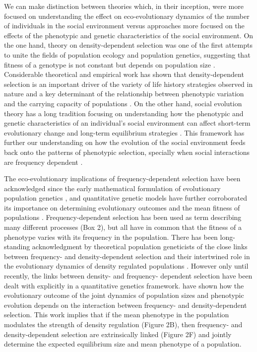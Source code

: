 \documentclass{article}
\begin{document}
We can make distinction between theories which, in their inception, were more focused on understanding the effect on eco-evolutionary dynamics of the number of individuals in the social environment versus approaches more focused on the effects of the phenotypic and genetic characteristics of the social environment. On the one hand, theory on density-dependent selection was one of the first attempts to unite the fields of population ecology and population genetics, suggesting that fitness of a genotype is not constant but depends on population size \citep{MacArthur1962, Anderson1971, Charlesworth1971}. Considerable theoretical and empirical work has shown that density-dependent selection is an important driver of the variety of life history strategies observed in nature and a key determinant of the relationship between phenotypic variation and the carrying capacity of populations \citep{Boyce1984, Mueller1991, Charlesworth1994,Travis2013, Joshi2001, Engen2013, Wright2018, Engen2020}. On the other hand, social evolution theory has a long tradition focusing on understanding how the phenotypic and genetic characteristics of an individual's social environment can affect short-term evolutionary change \citep{Hamilton1964a, frank1998foundations, Wolf1999SocialSelection, Queller1985a, Queller2017} and long-term equilibrium strategies \citep{MaynardSmith1982, McGill2007}. This framework has further our understanding on how the evolution of the social environment feeds back onto the patterns of phenotypic selection, specially when social interactions are frequency dependent \citep{West-Eberhard1979, QUELLER1984, Araya-Ajoy2020}. 

The eco-evolutionary implications of frequency-dependent selection have been acknowledged since the early mathematical formulation of evolutionary population genetics \citep{Fisher1930, Wright1948}, and quantitative genetic models have further corroborated its importance on determining evolutionary outcomes and the mean fitness of populations \citep{Lande1976, Lande2007, Svensson2018, Engen2020}. Frequency-dependent selection has been used as term describing many different processes (Box 2), but all have in common that the fitness of a phenotype varies with its frequency in the population. There has been long-standing acknowledgment by theoretical population geneticists of the close links between frequency- and density-dependent selection and their intertwined role in the evolutionary dynamics of density regulated populations \citep{Smouse1976, Anderson1983, Heino1998, Joshi2001}. However only until recently, the links between density- and frequency- dependent selection have been dealt with explicitly in a quantitative genetics framework. \cite{Engen2020} have shown how the evolutionary outcome of the joint dynamics of population sizes and phenotypic evolution depends on the interaction between frequency- and density-dependent selection. This work implies that if the mean phenotype in the population modulates the strength of density regulation (Figure 2B), then frequency- and density-dependent selection are extrinsically linked (Figure 2F) and jointly determine the expected equilibrium size and mean phenotype of a population.
 
\end{document}
